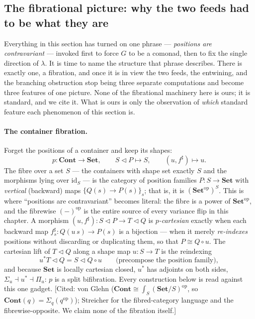 \documentclass[11pt,a4paper]{book}
\newcommand{\Set}{\mathbf{Set}}
\newcommand{\Cont}{\mathbf{Cont}}
\newcommand{\op}{^{\mathrm{op}}}
\newcommand{\cont}[2]{#1 \triangleleft #2}
\newcommand{\id}{\mathrm{id}}
\newcommand{\sh}{\sharp}
\theoremstyle{plain}
\theoremstyle{definition}
\theoremstyle{remark}
\newcommand{\prov}[1]{\hfill\textsf{\footnotesize[#1]}}
\begin{document}
\subsection{The fibrational picture: why the two feeds had to be what they are}
\label{sec:moncomon-fibration}

Everything in this section has turned on one phrase --- \emph{positions are contravariant} --- invoked
first to force $G$ to be a comonad, then to fix the single direction of $\lambda$. It is time to name the
structure that phrase describes. There is exactly one, a fibration, and once it is in view the two feeds,
the entwining, and the branching obstruction stop being three separate computations and become three
features of one picture. None of the fibrational machinery here is ours; it is standard, and we cite it.
What is ours is only the observation of \emph{which} standard feature each phenomenon of this section is.

\paragraph{The container fibration.} Forget the positions of a container and keep its shapes:
\[
  p\colon\Cont\longrightarrow\Set,\qquad \cont SP\mapsto S,\qquad (u,f^{\sh})\mapsto u.
\]
The fibre over a set $S$ --- the containers with shape set exactly $S$ and the morphisms lying over
$\id_{S}$ --- is the category of position families $P\colon S\to\Set$ with \emph{vertical} (backward) maps
$\{Q(s)\to P(s)\}_{s}$; that is, it is $(\Set\op)^{S}$. This is where ``positions are contravariant''
becomes literal: the fibre is a power of $\Set\op$, and the fibrewise $(-)\op$ is the entire source of every
variance flip in this chapter. A morphism $(u,f^{\sh})\colon\cont SP\to\cont TQ$ is \emph{$p$-cartesian}
exactly when each backward map $f^{\sh}_{s}\colon Q(u\,s)\to P(s)$ is a bijection --- when it merely
\emph{re-indexes} positions without discarding or duplicating them, so that $P\cong Q\circ u$. The cartesian
lift of $\cont TQ$ along a shape map $u\colon S\to T$ is the reindexing
\[
  u^{*}\cont TQ=\cont S{Q\circ u}\qquad\text{(precompose the position family)},
\]
and because $\Set$ is locally cartesian closed, $u^{*}$ has adjoints on both sides,
$\Sigma_{u}\dashv u^{*}\dashv\Pi_{u}$: $p$ is a split bifibration. Every construction below is read against this
one gadget.
\prov{Cited: von Glehn \cite{vonGlehn18} ($\Cont\cong\int_{S}(\Set/S)\op$, so
$\Cont(q)=\Sigma_{q}(q\op)$); Streicher \cite{Streicher} for the fibred-category language and the
fibrewise-opposite. We claim none of the fibration itself.}
\end{document}
